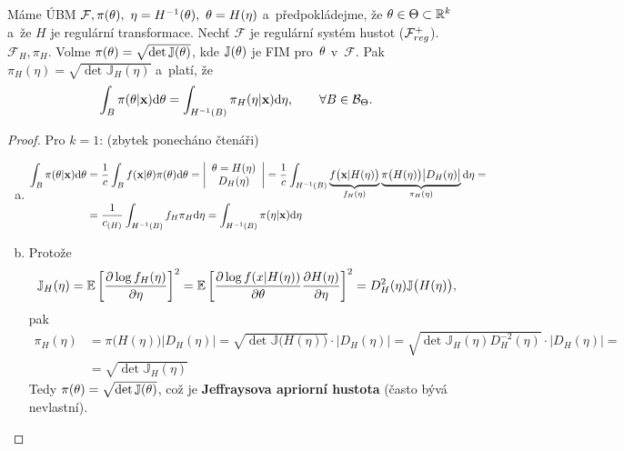 \begin{theorem}[Jeffreys]
	Máme ÚBM $\mathcal{F},\pi(\theta),~\eta=H^{-1}(\theta),~\theta=H(\eta)$ a~předpokládejme, že $\theta\in\Theta\subset\mathbb{R}^k$ a~že $H$ je regulární transformace. Nechť $\mathcal{F}$ je regulární systém hustot ($\mathcal{F}_{reg}^+$). $\mathcal{F}_H,\pi_H$. Volme $\pi(\theta)=\sqrt{\det \mathbb{J}(\theta)}$, kde $\mathbb{J}(\theta)$ je FIM pro~$\theta$ v~$\mathcal{F}$. Pak $\pi_H(\eta)=\sqrt{\det \mathbb{J}_H(\eta)}$ a~platí, že 
	$$ \int_B\pi(\theta|\textbf{x})\mathrm{d}\theta=\int_{H^{-1}(B)}\pi_H(\eta|\textbf{x})\mathrm{d}\eta,\qquad\forall B\in\mathcal{B}_\Theta.$$
	\begin{proof}
		Pro $k=1$: (zbytek ponecháno čtenáři)\begin{enumerate}[a)]
			\item \[
			\begin{split}
			\int_B\pi(\theta|\textbf{x})\mathrm{d}\theta&=\frac{1}{c}\int_B f(\textbf{x}|\theta)\pi(\theta)\mathrm{d}\theta=\left|\begin{array}{c}
			\theta=H(\eta)\\D_H(\eta)
			\end{array}
			\right|=\frac{1}{c}\int_{H^{-1}(B)}\underbrace{f\big(\textbf{x}|H(\eta)\big)}_{f_H(\eta)}\underbrace{\pi\big(H(\eta)\big)\big|D_H(\eta)\big|}_{\pi_H(\eta)}\mathrm{d}\eta=\\&=\frac{1}{c_{(H)}}\int_{H^{-1}(B)}f_H\pi_H\mathrm{d}\eta=\int_{H^{-1}(B)}\pi(\eta|\textbf{x})\mathrm{d}\eta
			\end{split}
			\]
			\item Protože 
			$$ \mathbb{J}_H(\eta)=\mathbb{E}\left[ \frac{\partial\log f_H(\eta)}{\partial\eta} \right]^2=\mathbb{E}\left[ \frac{\partial\log f(x|H(\eta))}{\partial\theta}\frac{\partial H(\eta)}{\partial\eta} \right]^2=D_H^2(\eta)\mathbb{J}\big(H(\eta)\big) ,$$
			pak \[
			\begin{split}
			\pi_H(\eta)&=\pi\big(H(\eta)\big)\big|D_H(\eta)\big|=\sqrt{\det \mathbb{J}\big(H(\eta)\big)}\cdot\big|D_H(\eta)\big|=\sqrt{\det \mathbb{J}_H(\eta)D_H^{-2}(\eta)}\cdot\big|D_H(\eta)\big|=\\&=\sqrt{\det \mathbb{J}_H(\eta)}
			\end{split}
			\]
			Tedy $\pi(\theta)=\sqrt{\det \mathbb{J}(\theta)}$, což je \textbf{Jeffraysova apriorní hustota} (často bývá nevlastní).
		\end{enumerate}
	\end{proof}
\end{theorem}
